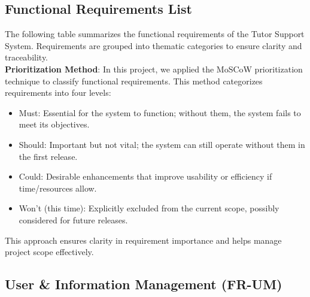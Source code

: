 \subsection{Functional Requirements List}
The following table summarizes the functional requirements of the Tutor Support System. Requirements are grouped into thematic categories to ensure clarity and traceability.\\

\textbf{Prioritization Method}: In this project, we applied the MoSCoW prioritization technique to classify functional requirements. This method categorizes requirements into four levels:
\begin{itemize}
    \item Must: Essential for the system to function; without them, the system fails to meet its objectives.
    \item Should: Important but not vital; the system can still operate without them in the first release.
    \item Could: Desirable enhancements that improve usability or efficiency if time/resources allow.
    \item Won’t (this time): Explicitly excluded from the current scope, possibly considered for future releases.
\end{itemize}

This approach ensures clarity in requirement importance and helps manage project scope effectively.

\subsection{User \& Information Management (FR-UM)}

